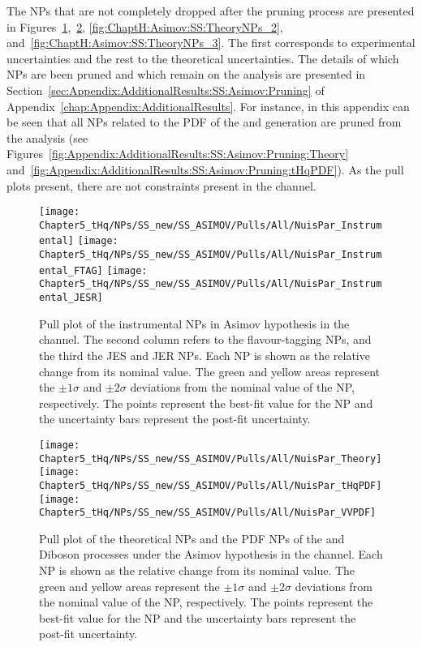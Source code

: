 The NPs that are not completely dropped after the pruning process are 
presented in Figures~\ref{fig:ChaptH:Asimov:SS:InstrumentalNPs},~\ref{fig:ChaptH:Asimov:SS:TheoryNPs_1},
\ref{fig:ChaptH:Asimov:SS:TheoryNPs_2}, and~\ref{fig:ChaptH:Asimov:SS:TheoryNPs_3}.
The first corresponds to experimental uncertainties and the rest to the theoretical uncertainties.
The details of which NPs are been pruned and which remain on the analysis are 
presented in Section~\ref{sec:Appendix:AdditionalResults:SS:Asimov:Pruning} of
Appendix~\ref{chap:Appendix:AdditionalResults}. For instance, in this appendix can be seen
that all NPs related to the PDF of the \ttbar and \ttW generation are pruned from the
analysis (see Figures~\ref{fig:Appendix:AdditionalResults:SS:Asimov:Pruning:Theory} 
and~\ref{fig:Appendix:AdditionalResults:SS:Asimov:Pruning:tHqPDF}).
As the pull plots present, there are not constraints present in the \dilepSStau channel.


\begin{figure}[h]
  \texttt{[image: Chapter5\_tHq/NPs/SS\_new/SS\_ASIMOV/Pulls/All/NuisPar\_Instrumental]}
  \texttt{[image: Chapter5\_tHq/NPs/SS\_new/SS\_ASIMOV/Pulls/All/NuisPar\_Instrumental\_FTAG]}
  \texttt{[image: Chapter5\_tHq/NPs/SS\_new/SS\_ASIMOV/Pulls/All/NuisPar\_Instrumental\_JESR]}
 
\caption{Pull plot of the instrumental NPs in Asimov hypothesis in the \dilepSStau channel.
   The second column refers to the flavour-tagging NPs, and the third the JES and JER NPs. 
   Each NP is shown as the relative change from its nominal value.
   The green and yellow areas represent the $\pm1\sigma$ and $\pm2\sigma$ deviations from the nominal value of the NP, respectively. 
   The points represent the best-fit value for the NP and the uncertainty bars represent the post-fit uncertainty.} 
\label{fig:ChaptH:Asimov:SS:InstrumentalNPs}
\end{figure}


\begin{figure}[h]
\centering
	\texttt{[image: Chapter5\_tHq/NPs/SS\_new/SS\_ASIMOV/Pulls/All/NuisPar\_Theory]}
	\texttt{[image: Chapter5\_tHq/NPs/SS\_new/SS\_ASIMOV/Pulls/All/NuisPar\_tHqPDF]}
  	\texttt{[image: Chapter5\_tHq/NPs/SS\_new/SS\_ASIMOV/Pulls/All/NuisPar\_VVPDF]}
\caption{Pull plot of the theoretical NPs and the PDF NPs of the \tHq and Diboson processes under the 
   Asimov hypothesis in the \dilepSStau channel.
   Each NP is shown as the relative change from its nominal value.
   The green and yellow areas represent the $\pm1\sigma$ and $\pm2\sigma$ deviations from the nominal value of the NP, respectively. 
   The points represent the best-fit value for the NP and the uncertainty bars represent the post-fit uncertainty.} 
\label{fig:ChaptH:Asimov:SS:TheoryNPs_1}
\end{figure}

